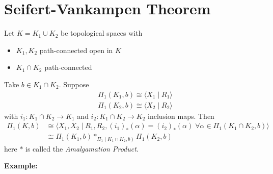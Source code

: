 \chapter{Seifert-Vankampen Theorem}

\begin{theorem}
    Let $K= K_1 \cup K_2$ be topological spaces with
    \begin{itemize}
        \item $K_1,K_2$ path-connected open in $K$
        \item $K_1 \cap K_2$ path-connected
    \end{itemize}
    Take $b \in K_1 \cap K_2$. Suppose
    \begin{align*}
        &\Pi_1(K_1,b) \cong \langle X_1 \mid R_1 \rangle\\
        &\Pi_1(K_2,b) \cong \langle X_2 \mid R_2 \rangle
    \end{align*}
    with $i_1: K_1 \cap K_2 \rightarrow K_1$ and $i_2: K_1 \cap K_2 \rightarrow K_2$ inclusion maps. Then
    \begin{align*}
        \Pi_1 (K,b) &\cong \langle X_1,X_2 \mid R_1,R_2, (i_1)_*(\alpha) = (i_2)_* (\alpha)\; \forall \alpha \in \Pi_1 (K_1 \cap K_2, b) \rangle\\
        &\cong \Pi_1(K_1,b) *_{\Pi_1 (K_1 \cap K_2,b)} \Pi_1 (K_2,b)
    \end{align*}
    here $*$ is called the \textit{Amalgamation Product}.
\end{theorem}

\noindent\textbf{Example:} 


